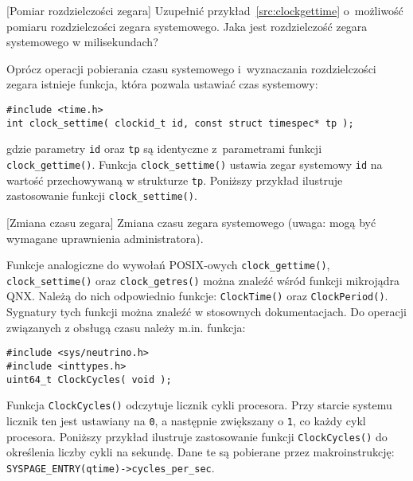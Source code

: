 \begin{example}{[Pomiar rozdzielczości zegara]} 
Uzupełnić przykład~\ref{src:clockgettime} o~możliwość pomiaru rozdzielczości zegara systemowego. Jaka jest rozdzielczość zegara systemowego w milisekundach?
\end{example} 

Oprócz operacji pobierania czasu systemowego i~wyznaczania rozdzielczości zegara istnieje funkcja, która pozwala ustawiać czas systemowy: 

\begin{lstlisting}[style=MyCStyle]
#include <time.h>
int clock_settime( clockid_t id, const struct timespec* tp );
\end{lstlisting}

gdzie parametry \lstinline[style=MyCStyle]{id} oraz \lstinline[style=MyCStyle]{tp} są identyczne z~parametrami funkcji \lstinline[style=MyCStyle]{clock_gettime()}. Funkcja \lstinline[style=MyCStyle]{clock_settime()} ustawia zegar systemowy \lstinline[style=MyCStyle]{id} na wartość przechowywaną w strukturze \lstinline[style=MyCStyle]{tp}. Poniższy przykład ilustruje zastosowanie funkcji \lstinline[style=MyCStyle]{clock_settime()}. 

\begin{example}{[Zmiana czasu zegara]} Zmiana czasu zegara systemowego (uwaga: mogą być wymagane uprawnienia administratora).

\end{example} 

Funkcje analogiczne do wywołań POSIX-owych \lstinline[style=MyCStyle]{clock_gettime()}, \lstinline[style=MyCStyle]{clock_settime()} oraz \lstinline[style=MyCStyle]{clock_getres()} można znaleźć wśród funkcji mikrojądra QNX. Należą do nich odpowiednio funkcje: \lstinline[style=MyCStyle]{ClockTime()} oraz \lstinline[style=MyCStyle]{ClockPeriod()}. Sygnatury tych funkcji można znaleźć w stosownych dokumentacjach.  Do operacji związanych z obsługą czasu należy m.in. funkcja: 

\begin{lstlisting}[style=MyCStyle]
#include <sys/neutrino.h>
#include <inttypes.h>
uint64_t ClockCycles( void );
\end{lstlisting}

Funkcja \lstinline[style=MyCStyle]{ClockCycles()} odczytuje licznik cykli procesora. Przy starcie systemu licznik ten jest ustawiany na \lstinline[style=MyCStyle]{0}, a następnie zwiększany o \lstinline[style=MyCStyle]{1}, co każdy cykl procesora. Poniższy przykład ilustruje zastosowanie funkcji \lstinline[style=MyCStyle]{ClockCycles()} do określenia liczby cykli na sekundę. Dane te są pobierane przez makroinstrukcję: \lstinline[style=MyCStyle]{SYSPAGE_ENTRY(qtime)->cycles_per_sec}. 

